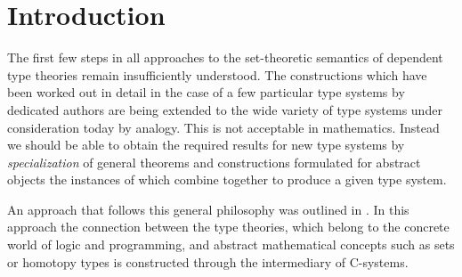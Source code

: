 \documentclass[12pt]{amsart}
\begin{document}



\maketitle

\tableofcontents

\section{Introduction}

The first few steps in all approaches to the set-theoretic semantics of dependent type theories remain insufficiently understood. The constructions which have been worked out in detail in the case of a few particular type systems by dedicated authors are being extended to the wide variety of type systems under consideration today by analogy. This is not acceptable in mathematics. Instead we should be able to obtain the required results for new type systems by {\em specialization} of general theorems and constructions formulated for abstract objects the instances of which combine together to produce a given type system. 







An approach that follows this general philosophy was outlined in \cite{CMUtalk}. In this approach the connection between the type theories, which belong to the concrete world of logic and programming, and abstract mathematical concepts such as sets or homotopy types is constructed through the intermediary of C-systems. 
\end{document}
